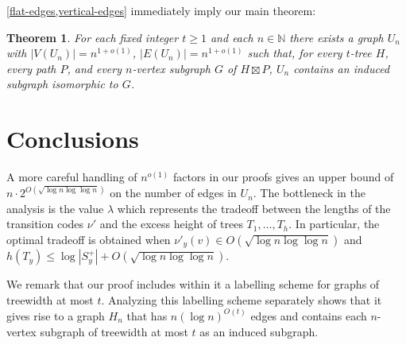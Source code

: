 \documentclass{patmorin}
\newcommand{\N}{\mathbb{N}}
\newtheorem{theorem}{Theorem}
\begin{document}
\cref{flat-edges,vertical-edges} immediately imply our main theorem:

\begin{theorem}
    For each fixed integer $t\ge 1$ and each $n\in \N$ there exists a graph $U_n$ with $|V(U_n)|=n^{1+o(1)}$, $|E(U_n)|= n^{1+o(1)}$ such that, for every $t$-tree $H$, every path $P$, and every $n$-vertex subgraph $G$ of $H\boxtimes P$, $U_n$ contains an induced subgraph isomorphic to $G$.
\end{theorem}

\section{Conclusions}

A more careful handling of $n^{o(1)}$ factors in our proofs gives an upper bound of $n\cdot 2^{O(\sqrt{\log n\log\log n})}$ on the number of edges in $U_n$.  The bottleneck in the analysis is the value $\lambda$ which represents the tradeoff between the lengths of the transition codes $\nu'$ and the excess height of trees $T_1,\ldots,T_h$.  In particular, the optimal tradeoff is obtained when $\nu'_y(v)\in O(\sqrt{\log n\log\log n})$ and $h(T_y)\le \log |S^+_y| + O(\sqrt{\log n\log\log n})$.

We remark that our proof includes within it a labelling scheme for graphs of treewidth at most $t$.  Analyzing this labelling scheme separately shows that it gives rise to a graph $H_n$ that has $n(\log n)^{O(t)}$ edges and contains each $n$-vertex subgraph of treewidth at most $t$ as an induced subgraph.



\end{document}
